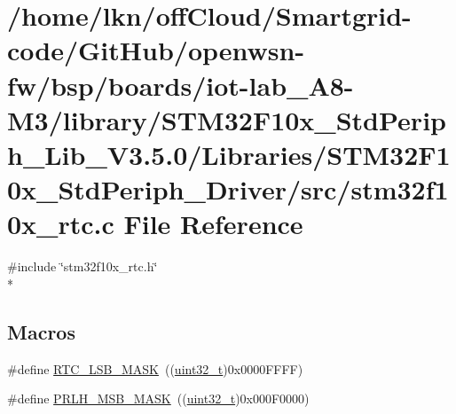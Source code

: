 \hypertarget{iot-lab___a8-_m3_2library_2_s_t_m32_f10x___std_periph___lib___v3_85_80_2_libraries_2_s_t_m32_f105a0fd4b430bdb9a0d6dbe2fc8a623ab2}{}\section{/home/lkn/off\+Cloud/\+Smartgrid-\/code/\+Git\+Hub/openwsn-\/fw/bsp/boards/iot-\/lab\+\_\+\+A8-\/\+M3/library/\+S\+T\+M32\+F10x\+\_\+\+Std\+Periph\+\_\+\+Lib\+\_\+\+V3.5.0/\+Libraries/\+S\+T\+M32\+F10x\+\_\+\+Std\+Periph\+\_\+\+Driver/src/stm32f10x\+\_\+rtc.c File Reference}
\label{iot-lab___a8-_m3_2library_2_s_t_m32_f10x___std_periph___lib___v3_85_80_2_libraries_2_s_t_m32_f105a0fd4b430bdb9a0d6dbe2fc8a623ab2}
{\ttfamily \#include \char`\"{}stm32f10x\+\_\+rtc.\+h\char`\"{}}\\*
\subsection*{Macros}
\begin{DoxyCompactItemize}
\item 
\#define \hyperlink{group___r_t_c___private___defines_gae19d75bb0ecb5e93d97e026a04d4854f}{R\+T\+C\+\_\+\+L\+S\+B\+\_\+\+M\+A\+SK}~((\hyperlink{_p_e___types_8h_a33594304e786b158f3fb30289278f5af}{uint32\+\_\+t})0x0000\+F\+F\+F\+F)
\item 
\#define \hyperlink{group___r_t_c___private___defines_ga47b3eed8e018a9139bc7bb374c7ca125}{P\+R\+L\+H\+\_\+\+M\+S\+B\+\_\+\+M\+A\+SK}~((\hyperlink{_p_e___types_8h_a33594304e786b158f3fb30289278f5af}{uint32\+\_\+t})0x000\+F0000)
\end{DoxyCompactItemize}
